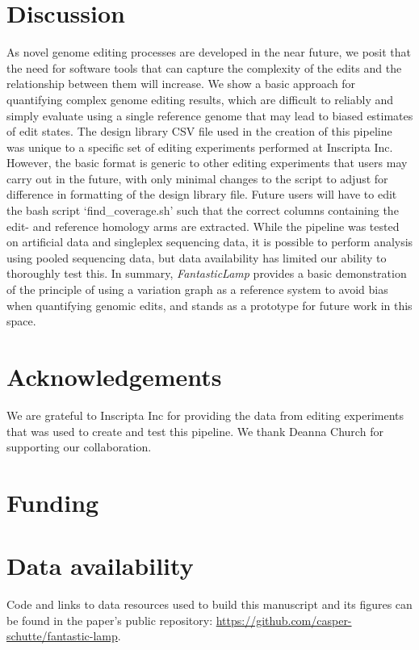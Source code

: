 \documentclass{bioinfo}
\theoremstyle{definition}
\begin{document}
\section*{Discussion}
\label{sec:discussion}
As novel genome editing processes are developed in the near future, we posit that the need for software tools that can capture the complexity of the edits and the relationship between them will increase.
We show a basic approach for quantifying complex genome editing results, which are difficult to reliably and simply evaluate using a single reference genome that may lead to biased estimates of edit states.
The design library CSV file used in the creation of this pipeline was unique to a specific set of editing experiments performed at Inscripta Inc.
However, the basic format is generic to other editing experiments that users may carry out in the future, with only minimal changes to the script to adjust for difference in formatting of the design library file.
Future users will have to edit the bash script `find\_coverage.sh' such that the correct columns containing the edit- and reference homology arms are extracted.
While the pipeline was tested on artificial data and singleplex sequencing data, it is possible to perform analysis using pooled sequencing data, but data availability has limited our ability to thoroughly test this.
In summary, \textit{FantasticLamp} provides a basic demonstration of the principle of using a variation graph as a reference system to avoid bias when quantifying genomic edits, and stands as a prototype for future work in this space.
\section*{Acknowledgements}
We are grateful to Inscripta Inc for providing the data from editing experiments that was used to create and test this pipeline. We thank Deanna Church for supporting our collaboration.

\section*{Funding}

\section*{Data availability}
Code and links to data resources used to build this manuscript and its figures can be found in the paper's public repository: \url{https://github.com/casper-schutte/fantastic-lamp}.




\end{document}
